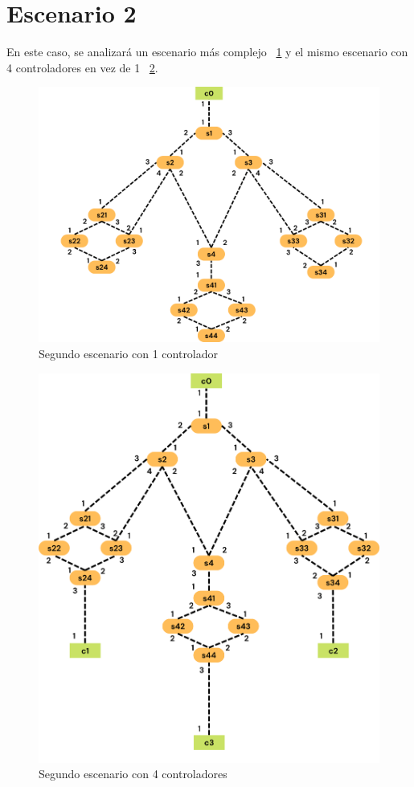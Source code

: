 \documentclass[a4paper, 12pt]{book}
\begin{document}
 	
 	\section{Escenario 2}
 	
 	En este caso, se analizará un escenario más complejo ~\ref{figura:escenario2-1c} y el mismo escenario con 4 controladores en vez de 1 ~\ref{figura:escenario2-4c}.
 	
 	\begin{figure}[H]
 		\centering
 		\includegraphics[width=16cm, keepaspectratio]{img/escenario2-1}
 		\caption{Segundo escenario con 1 controlador}
 		\label{figura:escenario2-1c}
 	\end{figure}
 	
 	\begin{figure}[H]
 		\centering
 		\includegraphics[width=16cm, keepaspectratio]{img/escenario2-2}
 		\caption{Segundo escenario con 4 controladores}
 		\label{figura:escenario2-4c}
 	\end{figure}
 	
\end{document}
